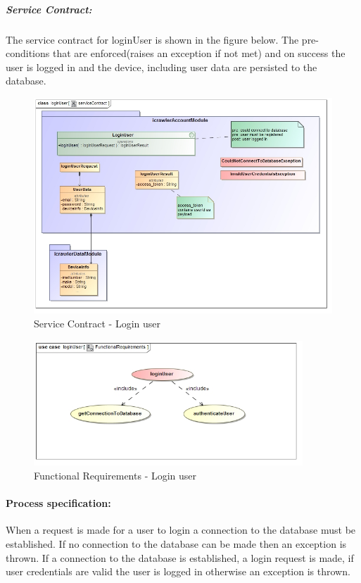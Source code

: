 \documentclass[hidelinks, 12pt, oneside]{article}
\begin{document}
	\subparagraph{Service Contract:}
		The service contract for loginUser is shown in the figure below. The pre-conditions that are enforced(raises an exception if not met) and on success the user is logged in and the device, including user data are persisted to the database.\newline 	
	
		\begin{figure}[!htbp]
    		\centering
    		\includegraphics[width=1.0\textwidth]{img/serviceContractLoginUser.jpg}
    		\caption{Service Contract - Login user}
    		\label{fig:ServiceCon_loginUser}
		\end{figure}
		
		
		\begin{figure}[!htbp]
    		\centering
    		\includegraphics[width=0.9\textwidth]{img/functionalRequirementsLoginUser.jpg}
    		\caption{Functional Requirements - Login user}
    		\label{fig:FunctionalReq_loginUser}
		\end{figure}
		
				
		\newpage
		\paragraph{Process specification:}
		When a request is made for a user to login a connection to the database must be established. If no connection to the database can be made then an exception is thrown. If a connection to the database is established, a login request is made, if user credentials are valid	the user is logged in otherwise an exception is thrown.		
		
\end{document}
